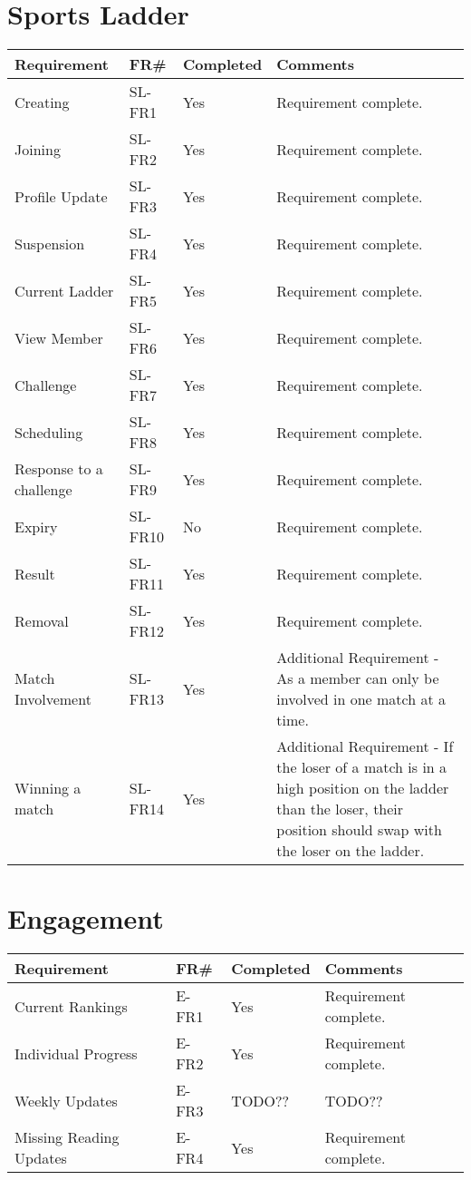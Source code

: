 \section{Sports Ladder}
\begin{tabular}{ |p{5cm}|l|l|p{8cm}|}
\hline
\textbf{Requirement}	&	\textbf{FR\#}	&	\textbf{Completed}	&	\textbf{Comments} \\
\hline
Creating 											& SL-FR1	& Yes 		& Requirement complete. \\
\hline
Joining 											& SL-FR2	& Yes 		& Requirement complete. \\
\hline
Profile Update 										& SL-FR3	& Yes		& Requirement complete. \\
\hline
Suspension 											& SL-FR4	& Yes 		& Requirement complete. \\
\hline
Current Ladder	 									& SL-FR5	& Yes 		& Requirement complete. \\
\hline
View Member											& SL-FR6	& Yes 		& Requirement complete. \\
\hline
Challenge 											& SL-FR7	& Yes		& Requirement complete. \\
\hline
Scheduling 											& SL-FR8	& Yes 		& Requirement complete. \\
\hline
Response to a challenge 							& SL-FR9 	& Yes 		& Requirement complete. \\
\hline
Expiry 												& SL-FR10 	& No		& Requirement complete. \\
\hline
Result 												& SL-FR11 	& Yes 		& Requirement complete. \\
\hline
Removal 											& SL-FR12 	& Yes 		& Requirement complete. \\
\hline
Match Involvement									& SL-FR13 	& Yes 		& Additional Requirement - As a member can only be involved in one match at a time. \\
\hline
Winning a match 									& SL-FR14 	& Yes 		& Additional Requirement - If the loser of a match is in a high position on the ladder than the loser, their position should swap with the loser on the ladder. \\

\hline
\end{tabular}

\section{Engagement}
\begin{tabular}{ |p{5cm}|l|l|p{8cm}|}
\hline
\textbf{Requirement}	&	\textbf{FR\#}	&	\textbf{Completed}	&	\textbf{Comments} \\
\hline
Current Rankings 									& E-FR1		& Yes	& Requirement complete. \\
\hline
Individual Progress									& E-FR2		& Yes	& Requirement complete. \\
\hline
Weekly Updates 										& E-FR3		& TODO??	& TODO?? \\
\hline
Missing Reading Updates 							& E-FR4		& Yes	& Requirement complete. \\

\hline
\end{tabular}


